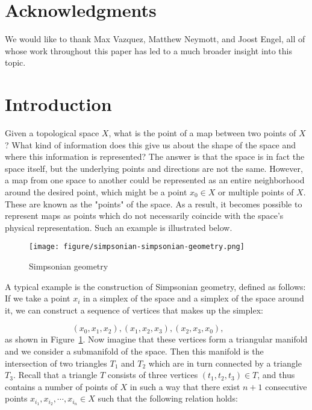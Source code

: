 \documentclass[a4paper,reqno,oneside]{article}
\begin{document}
\vspace{-0.2cm}


\tableofcontents

\section*{Acknowledgments}
We would like to thank Max Vazquez, Matthew Neymott, and Joost Engel, all of whose work throughout this paper has led to a much broader insight into this topic. 

\section{Introduction}
Given a topological space $X$, what is the point of a map between two points of $X$? What kind of information does this give us about the shape of the space and where this information is represented? The answer is that the space is in fact the space itself, but the underlying points and directions are not the same. However, a map from one space to another could be represented as an entire neighborhood around the desired point, which might be a point $x_0 \in X$ or multiple points of $X$. These are known as the "points" of the space. As a result, it becomes possible to represent maps as points which do not necessarily coincide with the space's physical representation. Such an example is illustrated below.

\medskip

\begin{figure}[ht]
    \centering
    \texttt{[image: figure/simpsonian-simpsonian-geometry.png]}
    \caption{Simpsonian geometry}
    \label{fig:simpsonian-simpsonian-geometry}
\end{figure}

A typical example is the construction of Simpsonian geometry, defined as follows: If we take a point $x_i$ in a simplex of the space and a simplex of the space around it, we can construct a sequence of vertices that makes up the simplex:

\[
(x_0, x_1, x_2), (x_1, x_2, x_3), (x_2, x_3, x_0) \textstyle,\qquad 
\]
as shown in Figure~\ref{fig:simpsonian-simpsonian-geometry}. Now imagine that these vertices form a triangular manifold and we consider a submanifold of the space. Then this manifold is the intersection of two triangles $T_1$ and $T_2$ which are in turn connected by a triangle $T_3$. Recall that a triangle $T$ consists of three vertices $(t_1, t_2, t_3) \in T$, and thus contains a number of points of $X$ in such a way that there exist $n+1$ consecutive points $x_{i_1}, x_{i_2}, \cdots, x_{i_n} \in X$ such that the following relation holds: 
\end{document}
